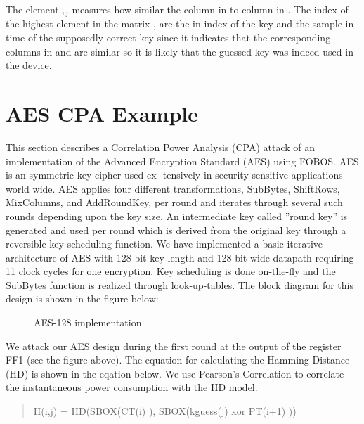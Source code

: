 \documentclass[letterpaper,10pt,english]{sphinxmanual}
\begin{document}
The element $_{\text{i,j}}$ measures how similar the column  in  to column  in .
The index of the highest element in the matrix  ,  are the in index of the key and the sample in time of the supposedly correct key since it indicates that the corresponding columns in  and  are similar so it is likely that the guessed key was indeed used in the device.


\chapter{AES CPA Example}
\label{\detokenize{aes_cpa_example2:aes-cpa-example}}\label{\detokenize{aes_cpa_example2::doc}}
This section describes a Correlation Power Analysis (CPA) attack of an implementation of the
Advanced Encryption Standard (AES) using FOBOS. AES is an symmetric-key cipher used ex-
tensively in security sensitive applications world wide. AES applies four different transformations,
SubBytes, ShiftRows, MixColumns, and AddRoundKey, per round and iterates through several
such rounds depending upon the key size. An intermediate key called ”round key” is generated and
used per round which is derived from the original key through a reversible key scheduling function.
We have implemented a basic iterative architecture of AES with 128-bit key length and 128-bit
wide datapath requiring 11 clock cycles for one encryption. Key scheduling is done on-the-fly and
the SubBytes function is realized through look-up-tables. The block diagram for this design is
shown in the figure below:

\begin{figure}[htbp]
\centering
\capstart

\noindent{}
\caption{AES-128 implementation}\label{\detokenize{aes_cpa_example2:id1}}\end{figure}

We attack our AES design during the first round at the output of the register FF1 (see the figure above). The equation for calculating the Hamming Distance (HD) is shown in the eqation below. We use
Pearson’s Correlation to correlate the instantaneous power consumption with the HD model.
\begin{quote}

H(i,j) = HD(SBOX(CT(i) ), SBOX(kguess(j) xor PT(i+1) ))
\end{quote}
\end{document}
